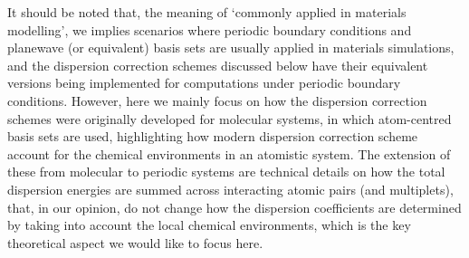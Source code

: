 
It should be noted that, the meaning of `commonly applied in materials modelling', we implies scenarios where periodic boundary conditions and planewave (or equivalent) basis sets are usually applied in materials simulations, and the dispersion correction schemes discussed below have their equivalent versions being implemented for computations under periodic boundary conditions. However, here we mainly focus on how the dispersion correction schemes were originally developed for molecular systems, in which atom-centred basis sets are used, highlighting how modern dispersion correction scheme account for the chemical environments in an atomistic system. The extension of these from molecular to periodic systems are  technical details on how the total dispersion energies are summed across interacting atomic pairs (and multiplets), that, in our opinion, do not change how the dispersion coefficients are determined by taking into account the local chemical environments, which is the key theoretical aspect we would like to focus here.

